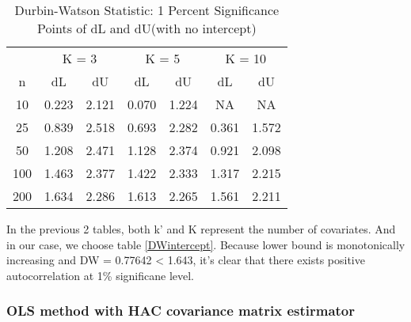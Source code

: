 \documentclass[
  12pt,
]{article}
\begin{document}
\begin{table}[htb] \centering 
    \caption{Durbin-Watson Statistic: 1 Percent Significance Points of dL and dU(with no intercept)} 
    \label{DWnointercept} 
    \small 
    \begin{tabular}{@{}ccccccc@{}}
        \cmidrule(r){1-7}
        & \multicolumn{2}{c}{K = 3}                   & \multicolumn{2}{c}{K = 5}                   & \multicolumn{2}{c}{K = 10}                  \\ \cmidrule(r){1-7}
        n                    & dL                   & dU                   & dL                   & dU                   & dL                   & dU                   \\
        10                   & 0.223                & 2.121                & 0.070                & 1.224                & NA                   & NA                   \\
        25                   & 0.839                & 2.518                & 0.693                & 2.282                & 0.361                & 1.572                \\
        50                   & 1.208                & 2.471                & 1.128                & 2.374                & 0.921                & 2.098                \\
        100                  & 1.463                & 2.377                & 1.422                & 2.333                & 1.317                & 2.215                \\
        200                  & 1.634                & 2.286                & 1.613                & 2.265                & 1.561                & 2.211                \\ \cmidrule(r){1-7}
    \end{tabular}
\end{table}

In the previous 2 tables, both k' and K represent the number of covariates. And in our case, we choose table \ref{DWintercept}. Because lower bound is monotonically increasing and DW = 0.77642 \textless{} 1.643, it's clear that there exists positive autocorrelation at 1\% significane level.

\hypertarget{ols-method-with-hac-covariance-matrix-estirmator}{%
\subsubsection{OLS method with HAC covariance matrix estirmator}\label{ols-method-with-hac-covariance-matrix-estirmator}}
\end{document}
